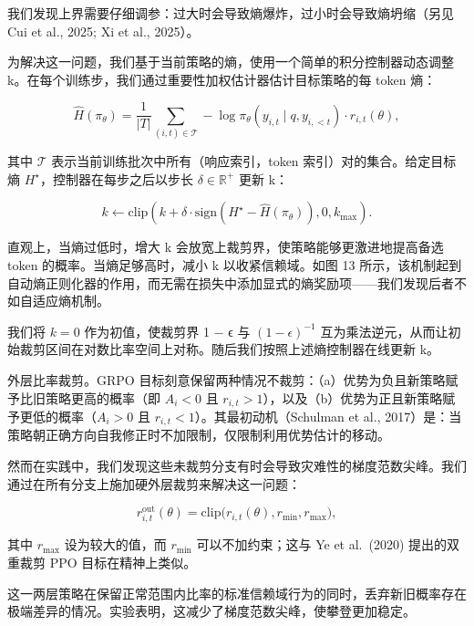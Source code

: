 我们发现上界需要仔细调参：过大时会导致熵爆炸，过小时会导致熵坍缩（另见 Cui et al., 2025; Xi et al., 2025）。

为解决这一问题，我们基于当前策略的熵，使用一个简单的积分控制器动态调整 k。在每个训练步，我们通过重要性加权估计器估计目标策略的每 token 熵：

\[
\hat { H } ( \pi _ { \theta } ) = \frac { 1 } { | T | } \sum _ { ( i , t ) \in \mathcal { T } } - \log \pi _ { \theta } ( y _ { i , t } \mid q , y _ { i , < t } ) \cdot r _ { i , t } ( \theta ) ,\tag{7}
\]

其中 \(\mathcal { T }\) 表示当前训练批次中所有（响应索引，token 索引）对的集合。给定目标熵 \(H ^ { \star }\)，控制器在每步之后以步长 \(\delta \in \mathbb { R } ^ { + }\) 更新 k：

\[
k \gets \mathrm { c l i p } \left( k + \delta \cdot \mathrm { s i g n } \left( H ^ { \star } - \hat { H } ( \pi _ { \theta } ) \right) , 0 , k _ { \mathrm { m a x } } \right) .\tag{8}
\]

直观上，当熵过低时，增大 k 会放宽上裁剪界，使策略能够更激进地提高备选 token 的概率。当熵足够高时，减小 k 以收紧信赖域。如图 13 所示，该机制起到自动熵正则化器的作用，而无需在损失中添加显式的熵奖励项——我们发现后者不如自适应熵机制。

我们将 \(k = 0\) 作为初值，使裁剪界 1 − ϵ 与 \(( 1 - \epsilon ) ^ { - 1 }\) 互为乘法逆元，从而让初始裁剪区间在对数比率空间上对称。随后我们按照上述熵控制器在线更新 k。

外层比率裁剪。GRPO 目标刻意保留两种情况不裁剪：（a）优势为负且新策略赋予比旧策略更高的概率（即 \(A _ { i } < 0\) 且 \(r _ { i , t } > 1\)），以及（b）优势为正且新策略赋予更低的概率（\(A _ { i } > 0\) 且 \(r _ { i , t } < 1\)）。其最初动机（Schulman et al., 2017）是：当策略朝正确方向自我修正时不加限制，仅限制利用优势估计的移动。



然而在实践中，我们发现这些未裁剪分支有时会导致灾难性的梯度范数尖峰。我们通过在所有分支上施加硬外层裁剪来解决这一问题：

\[
r _ { i , t } ^ { \mathrm { o u t } } ( \theta ) = \mathrm { c l i p } \big ( r _ { i , t } ( \theta ) , r _ { \mathrm { m i n } } , r _ { \mathrm { m a x } } \big ) ,\tag{9}
\]

其中 \(r _ { \mathrm { m a x } }\) 设为较大的值，而 \(r _ { \mathrm { m i n } }\) 可以不加约束；这与 Ye et al.~(2020) 提出的双重裁剪 PPO 目标在精神上类似。

这一两层策略在保留正常范围内比率的标准信赖域行为的同时，丢弃新旧概率存在极端差异的情况。实验表明，这减少了梯度范数尖峰，使攀登更加稳定。

